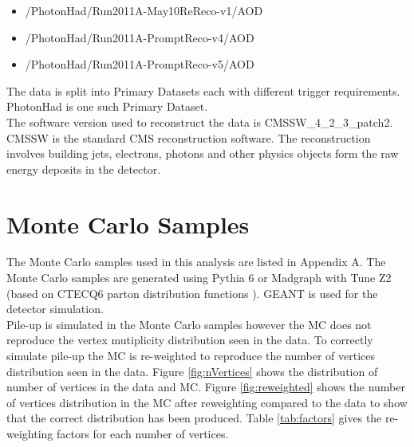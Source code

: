 \begin{itemize}
\item /PhotonHad/Run2011A-May10ReReco-v1/AOD %
\item /PhotonHad/Run2011A-PromptReco-v4/AOD %
\item /PhotonHad/Run2011A-PromptReco-v5/AOD %
\end{itemize}

The data is split into Primary Datasets each with different trigger
requirements. PhotonHad is one such Primary Dataset. \\

The software version used to reconstruct the data is CMSSW\_4\_2\_3\_patch2. 
CMSSW is the standard CMS reconstruction software. The reconstruction involves 
building jets, electrons, photons and other physics objects form the raw energy 
deposits in the detector.

\section{Monte Carlo Samples}
\label{sec:Monte_Carlo_Samples}

The Monte Carlo samples used in this analysis are listed in Appendix A. The 
Monte Carlo samples are generated using Pythia 6 \cite{pythia6} or Madgraph
\cite{madgraph} with Tune Z2 (based on CTECQ6 parton distribution functions 
\cite{tuneZ2}). GEANT \cite{geant} is used for the detector simulation. \\

Pile-up is simulated in the Monte Carlo samples however the MC does not
reproduce the vertex mutiplicity distribution seen in the data. To correctly
simulate pile-up the MC is re-weighted to reproduce the number of vertices
distribution seen in the data. Figure \ref{fig:nVertices} shows the distribution
of number of vertices in the data and MC. Figure \ref{fig:reweighted} shows the
number of vertices distribution in the MC after reweighting compared to the data
to show that the correct distribution has been produced. Table \ref{tab:factors}
gives the re-weighting factors for each number of vertices. \\


